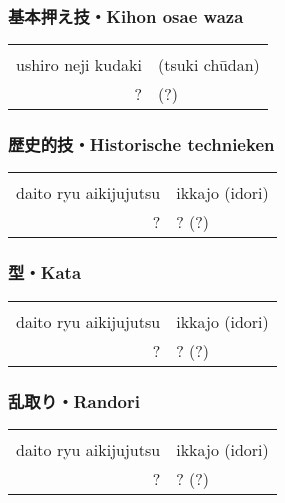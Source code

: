 \subsubsection{基本押え技・Kihon osae waza}
\begin{table}[H]
\begin{center}
\begin{tabular}{rl}
    \ruby{}{}\ruby{}{} & \\
    ushiro neji kudaki & (tsuki ch\={u}dan)\\
    ? & (?)
\end{tabular}
\end{center}
\label{kyuu_4_kihon_osae_waza}
\end{table}

\subsubsection{歴史的技・Historische technieken}
\begin{table}[H]
\begin{center}
\begin{tabular}{rl}
    \ruby{}{}\ruby{}{} & \\
    daito ryu aikijujutsu & ikkajo (idori)\\
    ? & ? (?)
\end{tabular}
\end{center}
\label{kyuu_4_historic}
\end{table}

\subsubsection{型・Kata}
\begin{table}[H]
\begin{center}
\begin{tabular}{rl}
    \ruby{}{}\ruby{}{} & \\
    daito ryu aikijujutsu & ikkajo (idori)\\
    ? & ? (?)
\end{tabular}
\end{center}
\label{kyuu_4_kata}
\end{table}

\subsubsection{乱取り・Randori}
\begin{table}[H]
\begin{center}
\begin{tabular}{rl}
    \ruby{}{}\ruby{}{} & \\
    daito ryu aikijujutsu & ikkajo (idori)\\
    ? & ? (?)
\end{tabular}
\end{center}
\label{kyuu_4_randori}
\end{table}
